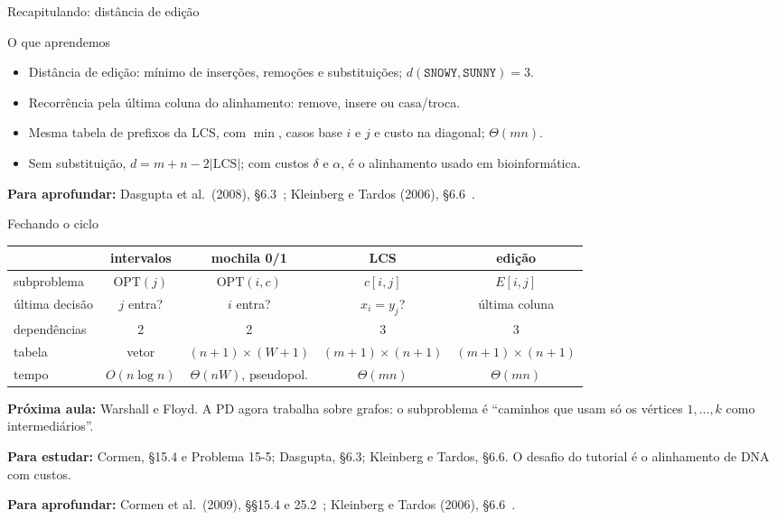 \documentclass[aspectratio=169,xcolor=table]{beamer}
\newcommand{\fonte}[1]{%
  \vfill
  {\tiny\color{gray!55!black}\textbf{Para aprofundar:} #1\par}%
}
\begin{document}
\begin{frame}{Recapitulando: distância de edição}
  \begin{block}{O que aprendemos}
    \begin{itemize}\scriptsize
      \item Distância de edição: mínimo de inserções, remoções e substituições;
            $d(\texttt{SNOWY},\texttt{SUNNY}) = 3$.
      \item Recorrência pela última coluna do alinhamento: remove, insere ou casa/troca.
      \item Mesma tabela de prefixos da LCS, com $\min$, casos base $i$ e $j$ e custo na
            diagonal; $\Theta(mn)$.
      \item Sem substituição, $d = m + n - 2|\mathrm{LCS}|$; com custos $\delta$ e
            $\alpha$, é o alinhamento usado em bioinformática.
    \end{itemize}
  \end{block}
  \fonte{Dasgupta et al.\ (2008), \S 6.3~\cite{dasgupta2008algorithms};
    Kleinberg e Tardos (2006), \S 6.6~\cite{kleinberg2006algorithm}.}
\end{frame}

\begin{frame}{Fechando o ciclo}
  \begin{center}
  \scriptsize
  \begin{tabular}{lcccc}
    \toprule
    & intervalos & mochila 0/1 & LCS & edição \\
    \midrule
    subproblema & $\mathrm{OPT}(j)$ & $\mathrm{OPT}(i,c)$ & $c[i,j]$ & $E[i,j]$ \\
    última decisão & $j$ entra? & $i$ entra? & $x_i = y_j$? & última coluna \\
    dependências & 2 & 2 & 3 & 3 \\
    tabela & vetor & $(n{+}1)\times(W{+}1)$ & $(m{+}1)\times(n{+}1)$ & $(m{+}1)\times(n{+}1)$ \\
    tempo & $O(n\log n)$ & $\Theta(nW)$, pseudopol. & $\Theta(mn)$ & $\Theta(mn)$ \\
    \bottomrule
  \end{tabular}
  \end{center}
  \medskip
  {\scriptsize
  \textbf{Próxima aula:} Warshall e Floyd. A PD agora trabalha sobre grafos: o subproblema
  é ``caminhos que usam só os vértices $1,\dots,k$ como intermediários''.
  \smallskip

  \textbf{Para estudar:} Cormen, \S 15.4 e Problema 15-5; Dasgupta, \S 6.3; Kleinberg e
  Tardos, \S 6.6. O desafio do tutorial é o alinhamento de DNA com custos.}
  \fonte{Cormen et al.\ (2009), \S\S 15.4 e 25.2~\cite{cormen2009introduction};
    Kleinberg e Tardos (2006), \S 6.6~\cite{kleinberg2006algorithm}.}
\end{frame}
\end{document}
